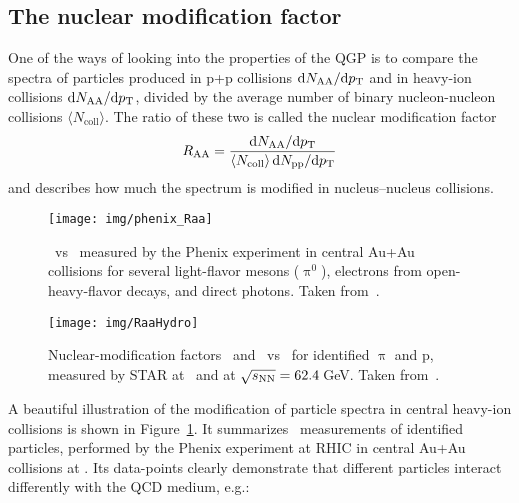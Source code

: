 \subsection{The nuclear modification factor \Raa}
One of the ways of looking into the properties of the QGP is to compare the spectra of particles produced in p+p collisions $\mathrm{d} N_\mathrm{AA}/\mathrm{d} {p_{\mathrm{T}}}$ and in heavy-ion collisions $\mathrm{d} N_\mathrm{AA}/\mathrm{d} {p_{\mathrm{T}}}$, divided by the average number of binary nucleon-nucleon collisions $\langle N_\mathrm{coll} \rangle$. The ratio of these two is called the nuclear modification factor \Raa
\begin{equation}
R_\text{AA} = \frac{\mathrm{d} N_\mathrm{AA}/\mathrm{d} {p_{\mathrm{T}}}}
{\langle N_\mathrm{coll} \rangle\, \mathrm{d} N_\mathrm{pp}/\mathrm{d} {p_{\mathrm{T}}}}
\end{equation}
and describes how much the spectrum is modified in nucleus--nucleus collisions.

\begin{figure}[!htb]
\centering
\texttt{[image: img/phenix\_Raa]} \\
\caption[\Raa\ vs \pt\ for $\uppi^0$, electrons from open-heavy-flavor decays, and direct photons.]{\label{PhenixRaa}\Raa\ vs \pt\, measured by the Phenix experiment in central Au+Au collisions for several light-flavor mesons ($\uppi^0$), electrons from open-heavy-flavor decays, and direct photons. Taken from~\cite{PhenixDecadal}\@.}

\end{figure}


\begin{figure}[!htb]
\centering
\texttt{[image: img/RaaHydro]}
\caption[Nuclear-modification factors \Raa\ and \Rcp\ vs \pt\ for identified $\uppi$ and p, measured by STAR at \snnFull\ and at $\snn = 62.4\,$GeV\@.]{\label{RaaHydro}Nuclear-modification factors \Raa\ and \Rcp\ vs \pt\ for identified $\uppi$ and p, measured by STAR at \snnFull\ and at $\snn = 62.4\,$GeV\@. Taken from~\cite{RaaPiP}\@.}

\end{figure}

A beautiful illustration of the modification of particle spectra in central heavy-ion collisions is shown in Figure~\ref{PhenixRaa}\@. It summarizes \Raa\ measurements of identified particles, performed by the Phenix experiment at RHIC in central Au+Au collisions at \snnFull\@. Its data-points clearly demonstrate that different particles interact differently with the QCD medium, e.g.:


